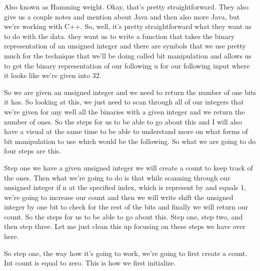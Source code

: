 \expandafter\def\csname sourceexcerpt@49\endcsname{%
Also known as Hamming weight. Okay, that's pretty straightforward. They also give us a
couple notes and mention about Java and then also more Java, but we're working with
C++. So, well, it's pretty straightforward what they want us to do with the data. they
want us to write a function that takes the binary representation of an unsigned
integer and there are symbols that we use pretty much for the technique that we'll be
doing called bit manipulation and allows us to get the binary representation of our
following u for our following input where it looks like we're given into 32.

So we are given an unsigned integer and we need to return the number of one bits it
has. So looking at this, we just need to scan through all of our integers that we're
given for any well all the binaries with a given integer and we return the number of
ones. So the steps for us to be able to go about this and I will also have a visual at
the same time to be able to understand more on what forms of bit manipulation to use
which would be the following. So what we are going to do four steps are this.

Step one we have a given unsigned integer we will create a count to keep track of the
ones. Then what we're going to do is that while scanning through our unsigned integer
if n at the specified index, which is represent by and equals 1, we're going to
increase our count and then we will write shift the unsigned integer by one bit to
check for the rest of the bits and finally we will return our count. So the steps for
us to be able to go about this. Step one, step two, and then step three. Let me just
clean this up focusing on these steps we have over here.

So step one, the way how it's going to work, we're going to first create a count. Int
count is equal to zero. This is how we first initialize.
}
